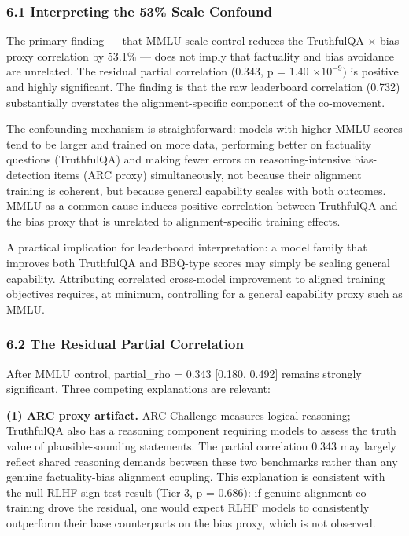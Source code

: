 
\subsubsection{6.1 Interpreting the 53\% Scale Confound}

The primary finding --- that MMLU scale control reduces the TruthfulQA $\times$ bias-proxy correlation by 53.1\% --- does not imply that factuality and bias avoidance are unrelated. The residual partial correlation (0.343, p = 1.40 $\times 10^{-9})$ is positive and highly significant. The finding is that the raw leaderboard correlation (0.732) substantially overstates the alignment-specific component of the co-movement.

The confounding mechanism is straightforward: models with higher MMLU scores tend to be larger and trained on more data, performing better on factuality questions (TruthfulQA) and making fewer errors on reasoning-intensive bias-detection items (ARC proxy) simultaneously, not because their alignment training is coherent, but because general capability scales with both outcomes. MMLU as a common cause induces positive correlation between TruthfulQA and the bias proxy that is unrelated to alignment-specific training effects.

A practical implication for leaderboard interpretation: a model family that improves both TruthfulQA and BBQ-type scores may simply be scaling general capability. Attributing correlated cross-model improvement to aligned training objectives requires, at minimum, controlling for a general capability proxy such as MMLU.

\subsubsection{6.2 The Residual Partial Correlation}

After MMLU control, partial\_rho = 0.343 [0.180, 0.492] remains strongly significant. Three competing explanations are relevant:

\textbf{(1) ARC proxy artifact.} ARC Challenge measures logical reasoning; TruthfulQA also has a reasoning component requiring models to assess the truth value of plausible-sounding statements. The partial correlation 0.343 may largely reflect shared reasoning demands between these two benchmarks rather than any genuine factuality-bias alignment coupling. This explanation is consistent with the null RLHF sign test result (Tier 3, p = 0.686): if genuine alignment co-training drove the residual, one would expect RLHF models to consistently outperform their base counterparts on the bias proxy, which is not observed.

